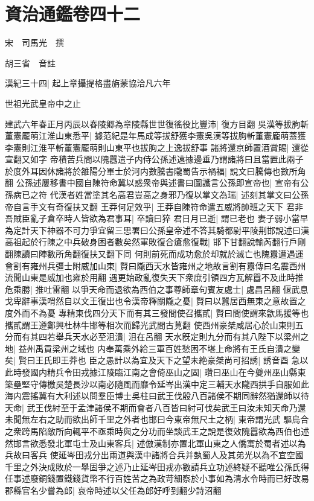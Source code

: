 \chapter{資治通鑑卷四十二}
宋　司馬光　撰

胡三省　音註

漢紀三十四|{
	起上章攝提格盡旃蒙協洽凡六年}


世祖光武皇帝中之止

建武六年春正月丙辰以舂陵郷為章陵縣世世復徭役比豐沛|{
	復方目翻}
吳漢等拔胊斬董憲龎萌江淮山東悉平|{
	據范紀是年馬成等拔舒獲李憲吳漢等拔朐斬董憲龐萌蓋獲李憲則江淮平斬董憲龎萌則山東平也拔胊之上逸拔舒事}
諸將還京師置酒賞賜|{
	還從宣翻又如字}
帝積苦兵間以隗囂遣子内侍公孫述遠據邊垂乃謂諸將曰且當置此兩子於度外耳因休諸將於雒陽分軍士於河内數騰書隴蜀告示禍福|{
	說文曰騰傳也數所角翻}
公孫述屢移書中國自陳符命冀以惑衆帝與述書曰圖讖言公孫即宣帝也|{
	宣帝有公孫病已之符}
代漢者姓當塗其名高君豈高之身邪乃復以掌文為瑞|{
	述刻其掌文曰公孫帝自言手文有奇復扶又翻}
王莽何足效乎|{
	王莽自陳符命遣五威將帥班之天下}
君非吾賊臣亂子倉卒時人皆欲為君事耳|{
	卒讀曰猝}
君日月已逝|{
	謂已老也}
妻子弱小當早為定計天下神器不可力爭宜留三思署曰公孫皇帝述不答其騎都尉平陵荆邯說述曰漢高祖起於行陳之中兵破身困者數矣然軍敗復合瘡愈復戰|{
	邯下甘翻說輸芮翻行戶剛翻陳讀曰陣數所角翻復扶又翻下同}
何則前死而成功愈於却就於滅亡也隗囂遭遇運會割有雍州兵彊士附威加山東|{
	賢曰隴西天水皆雍州之地故言割有囂傳曰名震西州流聞山東是威加也雍於用翻}
遇更始政亂復失天下衆庶引領四方瓦解囂不及此時推危乘勝|{
	推吐雷翻}
以爭天命而退欲為西伯之事尊師章句賓友處士|{
	處昌呂翻}
偃武息戈卑辭事漢喟然自以文王復出也令漢帝釋關隴之憂|{
	賢曰以囂居西無東之意故置之度外而不為憂}
專精東伐四分天下而有其三發間使召攜貳|{
	賢曰間使謂來歙馬援等也攜貳謂王遵鄭興杜林牛邯等相次而歸光武間古莧翻}
使西州豪桀咸居心於山東則五分而有其四若舉兵天水必至沮潰|{
	沮在呂翻}
天水旣定則九分而有其八陛下以梁州之地|{
	益州禹貢梁州之域也}
内奉萬乘外給三軍百姓愁困不堪上命將有王氏自潰之變矣|{
	賢曰王氏即王莽也}
臣之愚計以為宜及天下之望未絶豪桀尚可招誘|{
	誘音酉}
急以此時發國内精兵令田戎據江陵臨江南之會倚巫山之固|{
	瓚曰巫山在今夔州巫山縣東}
築壘堅守傳檄吳楚長沙以南必隨風而靡令延岑出漢中定三輔天水隴西拱手自服如此海内震搖冀有大利述以問羣臣博士吳柱曰武王伐殷八百諸侯不期同辭然猶還師以待天命|{
	武王伐紂至于孟津諸侯不期而會者八百皆曰紂可伐矣武王曰汝未知天命乃還}
未聞無左右之助而欲出師千里之外者也邯曰今東帝無尺土之柄|{
	東帝謂光武}
驅烏合之衆跨馬陷敵所向輒平不亟乘時與之分功而坐談武王之說是復效隗囂欲為西伯也述然邯言欲悉發北軍屯士及山東客兵|{
	述倣漢制亦置北軍山東之人僑寓於蜀者述以為兵故曰客兵}
使延岑田戎分出兩道與漢中諸將合兵并埶蜀人及其弟光以為不宜空國千里之外決成敗於一舉固爭之述乃止延岑田戎亦數請兵立功述終疑不聽唯公孫氏得任事述廢銅錢置鐵錢貨幣不行百姓苦之為政苛細察於小事如為清水令時而已好改易郡縣官名少嘗為郎|{
	哀帝時述以父任為郎好呼到翻少詩沼翻}
